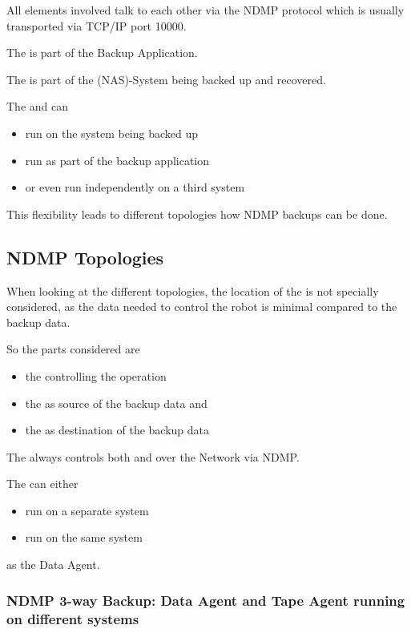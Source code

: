 All elements involved talk to each other via the NDMP protocol which is usually transported via TCP/IP port 10000.


The \DataManagementAgent is part of the Backup Application.

The \DataAgent is part of the (NAS)-System being backed up and recovered.

The \TapeAgent and \RobotAgent can
\begin{itemize}
    \item run on the system being backed up
    \item run as part of the backup application
    \item or even run independently on a third system
\end{itemize}

This flexibility leads to different topologies how NDMP backups can be done.

\subsection{NDMP Topologies}

When looking at the different topologies, the location of the \RobotAgent is not specially considered,
as the data needed to control the robot is minimal compared to the backup data.

So the parts considered are
\begin{itemize}
  \item the \DataManagementAgent controlling the operation
  \item the \DataAgent as source of the backup data and
  \item the \TapeAgent as destination of the backup data
\end{itemize}



The \DataManagementAgent always controls both \DataAgent and \TapeAgent over the Network via NDMP.

The \TapeAgent can either
\begin{itemize}
    \item run on a separate system
    \item run on the same system
\end{itemize}
as the Data Agent.


\subsubsection{NDMP 3-way Backup: Data Agent and Tape Agent running on different systems}

